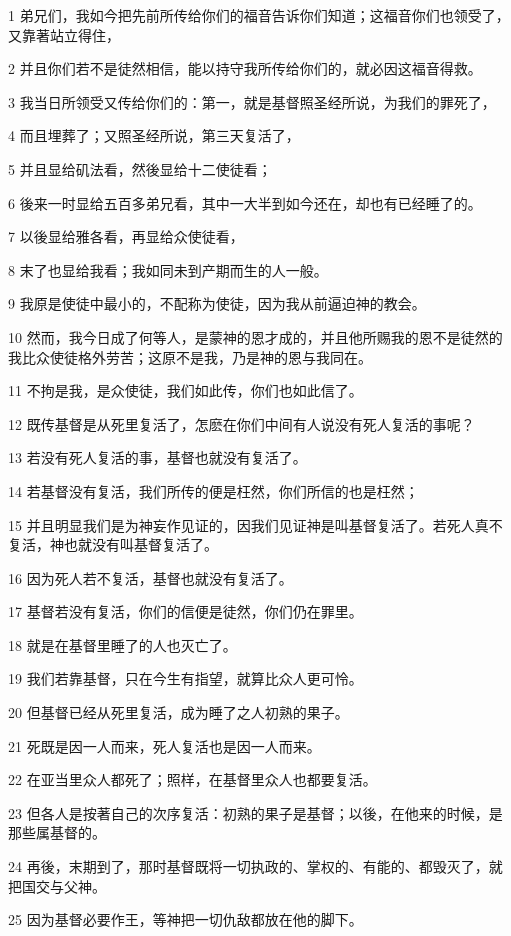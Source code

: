 \par 1 弟兄们，我如今把先前所传给你们的福音告诉你们知道；这福音你们也领受了，又靠著站立得住，
\par 2 并且你们若不是徒然相信，能以持守我所传给你们的，就必因这福音得救。
\par 3 我当日所领受又传给你们的：第一，就是基督照圣经所说，为我们的罪死了，
\par 4 而且埋葬了；又照圣经所说，第三天复活了，
\par 5 并且显给矶法看，然後显给十二使徒看；
\par 6 後来一时显给五百多弟兄看，其中一大半到如今还在，却也有已经睡了的。
\par 7 以後显给雅各看，再显给众使徒看，
\par 8 末了也显给我看；我如同未到产期而生的人一般。
\par 9 我原是使徒中最小的，不配称为使徒，因为我从前逼迫神的教会。
\par 10 然而，我今日成了何等人，是蒙神的恩才成的，并且他所赐我的恩不是徒然的我比众使徒格外劳苦；这原不是我，乃是神的恩与我同在。
\par 11 不拘是我，是众使徒，我们如此传，你们也如此信了。
\par 12 既传基督是从死里复活了，怎麽在你们中间有人说没有死人复活的事呢？
\par 13 若没有死人复活的事，基督也就没有复活了。
\par 14 若基督没有复活，我们所传的便是枉然，你们所信的也是枉然；
\par 15 并且明显我们是为神妄作见证的，因我们见证神是叫基督复活了。若死人真不复活，神也就没有叫基督复活了。
\par 16 因为死人若不复活，基督也就没有复活了。
\par 17 基督若没有复活，你们的信便是徒然，你们仍在罪里。
\par 18 就是在基督里睡了的人也灭亡了。
\par 19 我们若靠基督，只在今生有指望，就算比众人更可怜。
\par 20 但基督已经从死里复活，成为睡了之人初熟的果子。
\par 21 死既是因一人而来，死人复活也是因一人而来。
\par 22 在亚当里众人都死了；照样，在基督里众人也都要复活。
\par 23 但各人是按著自己的次序复活：初熟的果子是基督；以後，在他来的时候，是那些属基督的。
\par 24 再後，末期到了，那时基督既将一切执政的、掌权的、有能的、都毁灭了，就把国交与父神。
\par 25 因为基督必要作王，等神把一切仇敌都放在他的脚下。
